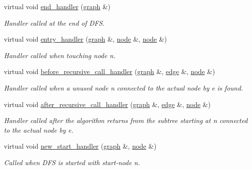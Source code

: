 \begin{DoxyCompactItemize}
virtual void \mbox{\hyperlink{classdfs_a59c512fa99ad3809db3e24347ab43b85}{end\+\_\+handler}} (\mbox{\hyperlink{classgraph}{graph}} \&)
\begin{DoxyCompactList}\small\item\em Handler called at the end of D\+FS. \end{DoxyCompactList}\item 
virtual void \mbox{\hyperlink{classdfs_a6473b0a5d792d9e45c3d32dfdc5b5ffc}{entry\+\_\+handler}} (\mbox{\hyperlink{classgraph}{graph}} \&, \mbox{\hyperlink{classnode}{node}} \&, \mbox{\hyperlink{classnode}{node}} \&)
\begin{DoxyCompactList}\small\item\em Handler called when touching node {\itshape n}. \end{DoxyCompactList}\item 
virtual void \mbox{\hyperlink{classdfs_a401190846f59af2a49ba036e99230152}{before\+\_\+recursive\+\_\+call\+\_\+handler}} (\mbox{\hyperlink{classgraph}{graph}} \&, \mbox{\hyperlink{classedge}{edge}} \&, \mbox{\hyperlink{classnode}{node}} \&)
\begin{DoxyCompactList}\small\item\em Handler called when a unused node {\itshape n} connected to the actual node by {\itshape e} is found. \end{DoxyCompactList}\item 
virtual void \mbox{\hyperlink{classdfs_a92fdca8a77b55d08b129aeab4fc66e4c}{after\+\_\+recursive\+\_\+call\+\_\+handler}} (\mbox{\hyperlink{classgraph}{graph}} \&, \mbox{\hyperlink{classedge}{edge}} \&, \mbox{\hyperlink{classnode}{node}} \&)
\begin{DoxyCompactList}\small\item\em Handler called after the algorithm returns from the subtree starting at {\itshape n} connected to the actual node by {\itshape e}. \end{DoxyCompactList}\item 
virtual void \mbox{\hyperlink{classdfs_a304b14458fb78f9feb3d8d5683d3cab5}{new\+\_\+start\+\_\+handler}} (\mbox{\hyperlink{classgraph}{graph}} \&, \mbox{\hyperlink{classnode}{node}} \&)
\begin{DoxyCompactList}\small\item\em Called when D\+FS is started with start-\/node {\itshape n}. \end{DoxyCompactList}\end{DoxyCompactItemize}
